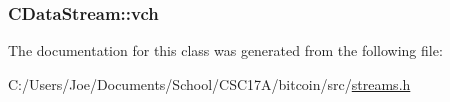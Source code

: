 \subsubsection[{vch}]{ C\+Data\+Stream\+::vch\hspace{0.3cm}{\ttfamily [protected]}}\label{class_c_data_stream_ac875adb8c720c48abd1a7c82f3452dda}


The documentation for this class was generated from the following file\+:\begin{DoxyCompactItemize}
\item 
C\+:/\+Users/\+Joe/\+Documents/\+School/\+C\+S\+C17\+A/bitcoin/src/\hyperlink{streams_8h}{streams.\+h}\end{DoxyCompactItemize}
